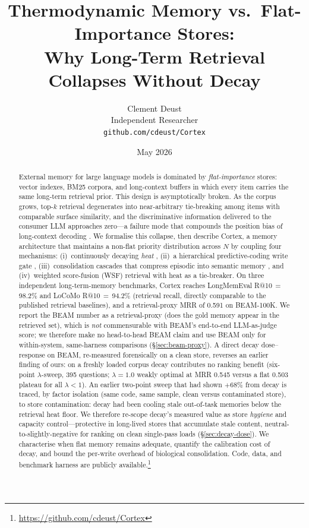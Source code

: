 \documentclass[11pt]{article}
\title{Thermodynamic Memory vs.\ Flat-Importance Stores:\\
Why Long-Term Retrieval Collapses Without Decay}
\author{
  Clement Deust\\
  Independent Researcher\\
  \texttt{github.com/cdeust/Cortex}
}
\date{May 2026}
\begin{document}
\maketitle

\begin{abstract}
External memory for large language models is dominated by
\emph{flat-importance} stores: vector indexes, BM25 corpora, and
long-context buffers in which every item carries the same long-term
retrieval prior.  This design is asymptotically broken.  As the
corpus grows, top-$k$ retrieval degenerates into near-arbitrary
tie-breaking among items with comparable surface similarity, and
the discriminative information delivered to the consumer LLM
approaches zero---a failure mode that compounds the position bias
of long-context decoding \citep{Liu2023}.  We formalise this
collapse, then describe Cortex, a memory architecture that
maintains a non-flat priority distribution across $N$ by coupling
four mechanisms: (i)~continuously decaying \emph{heat}
\citep{Ebbinghaus1885}, (ii)~a hierarchical predictive-coding
write gate \citep{Friston2010}, (iii)~consolidation cascades that
compress episodic into semantic memory
\citep{Kandel2001,McClelland1995}, and (iv)~weighted score-fusion
(WSF) retrieval with heat as a tie-breaker.  On three independent
long-term-memory
benchmarks, Cortex reaches LongMemEval R@10\,$=$\,98.2\% and
LoCoMo R@10\,$=$\,94.2\% (retrieval recall, directly comparable to
the published retrieval baselines), and a retrieval-proxy MRR of
0.591 on BEAM-100K.  We report the BEAM number as a retrieval-proxy
(does the gold memory appear in the retrieved set), which is
\emph{not} commensurable with BEAM's end-to-end LLM-as-judge score;
we therefore make no head-to-head BEAM claim and use BEAM only for
within-system, same-harness comparisons (\S\ref{sec:beam-proxy}).
A direct decay dose--response on BEAM, re-measured forensically on a
clean store, reverses an earlier finding of ours: on a freshly loaded
corpus decay contributes no ranking benefit (six-point
$\lambda$-sweep, 395 questions; $\lambda = 1.0$ weakly optimal at MRR
0.545 versus a flat 0.503 plateau for all $\lambda < 1$).  An earlier
two-point sweep that had shown $+68\%$ from decay is traced, by
factor isolation (same code, same sample, clean versus contaminated
store), to store contamination: decay had been cooling stale
out-of-task memories below the retrieval heat floor.  We therefore
re-scope decay's measured value as store \emph{hygiene} and capacity
control---protective in long-lived stores that accumulate stale
content, neutral-to-slightly-negative for ranking on clean
single-pass loads (\S\ref{sec:decay-dose}).  We characterise when
flat memory remains adequate, quantify the calibration cost of
decay, and bound the per-write overhead of biological
consolidation.  Code, data, and benchmark harness are publicly
available.\footnote{\url{https://github.com/cdeust/Cortex}}
\end{abstract}
\end{document}
